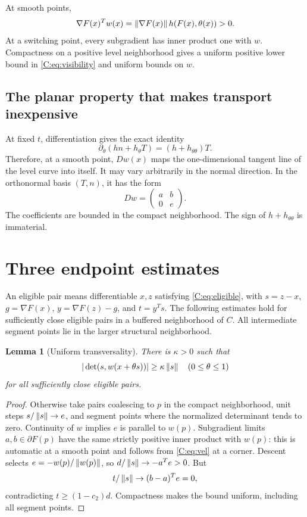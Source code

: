 \documentclass[10pt,oneside,openany]{book}
\newtheorem{lemma}{Lemma}[chapter]
\theoremstyle{remark}\newtheorem{remark}{Remark}[chapter]
\begin{document}
At smooth points,
\begin{equation}\label{C:eq:visibility}
 \nabla F(x)^Tw(x)=\left\lVert\nabla F(x)\right\rVert h(F(x),\theta(x))>0.
\end{equation}
At a switching point, every subgradient has inner product one with $w$. Compactness on a positive level neighborhood gives a uniform positive lower bound in \eqref{C:eq:visibility} and uniform bounds on $w$.

\subsection{The planar property that makes transport inexpensive}
At fixed $t$, differentiation gives the exact identity
\begin{equation}\label{C:eq:angleidentity}
 \partial_\theta(hn+h_\theta T)=(h+h_{\theta\theta})T.
\end{equation}
Therefore, at a smooth point, $Dw(x)$ maps the one-dimensional tangent line of the level curve into itself. It may vary arbitrarily in the normal direction. In the orthonormal basis $(T,n)$, it has the form
\begin{equation}\label{C:eq:triangular}
 Dw=\begin{pmatrix} a&b\\0&e\end{pmatrix}.
\end{equation}
The coefficients are bounded in the compact neighborhood. The sign of $h+h_{\theta\theta}$ is immaterial.


\setcounter{section}{4}
\setcounter{theorem}{4}
\setcounter{equation}{12}
\section{Three endpoint estimates}
An eligible pair means differentiable $x,z$ satisfying \eqref{C:eq:eligible}, with $s=z-x$, $g=\nabla F(x)$, $y=\nabla F(z)-g$, and $t=y^Ts$. The following estimates hold for sufficiently close eligible pairs in a buffered neighborhood of $C$. All intermediate segment points lie in the larger structural neighborhood.

\begin{lemma}[Uniform transversality]\label{C:lem:trans}
There is $\kappa>0$ such that
\[
 |\det(s,w(x+\theta s))|\ge\kappa\left\lVert s\right\rVert
 \quad(0\le\theta\le1)
\]
for all sufficiently close eligible pairs.
\end{lemma}
\begin{proof}
Otherwise take pairs coalescing to $p$ in the compact neighborhood, unit steps $s/\left\lVert s\right\rVert\to e$, and segment points where the normalized determinant tends to zero. Continuity of $w$ implies $e$ is parallel to $w(p)$. Subgradient limits $a,b\in\partial F(p)$ have the same strictly positive inner product with $w(p)$: this is automatic at a smooth point and follows from \eqref{C:eq:vel} at a corner. Descent selects $e=-w(p)/\left\lVert w(p)\right\rVert$, so $d/\left\lVert s\right\rVert\to-a^Te>0$. But
\[
 t/\left\lVert s\right\rVert\to(b-a)^Te=0,
\]
contradicting $t\ge(1-c_2)d$. Compactness makes the bound uniform, including all segment points.
\end{proof}
\end{document}
